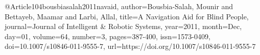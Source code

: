 @Article{104bousbiasalah2011navaid,
author={Bousbia-Salah, Mounir
and Bettayeb, Maamar
and Larbi, Allal},
title={A Navigation Aid for Blind People},
journal={Journal of Intelligent {\&} Robotic Systems},
year={2011},
month={Dec},
day={01},
volume={64},
number={3},
pages={387-400},
issn={1573-0409},
doi={10.1007/s10846-011-9555-7},
url={https://doi.org/10.1007/s10846-011-9555-7}
}
